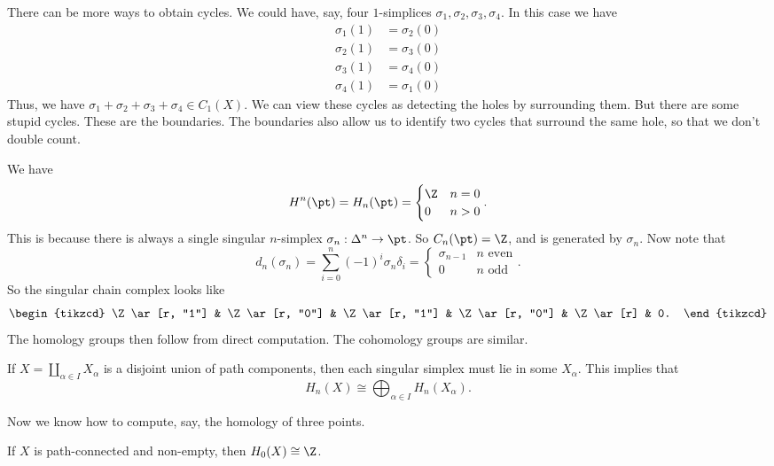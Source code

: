\documentclass[a4paper]{article}
\begin{document}
There can be more ways to obtain cycles. We could have, say, four $1$-simplices $\sigma_1, \sigma_2, \sigma_3, \sigma_4$. In this case we have
\begin{align*}
  \sigma_1(1) &= \sigma_2(0)\\
  \sigma_2(1) &= \sigma_3(0)\\
  \sigma_3(1) &= \sigma_4(0)\\
  \sigma_4(1) &= \sigma_1(0)
\end{align*}
Thus, we have $\sigma_1 + \sigma_2 + \sigma_3 + \sigma_4 \in C_1(X)$. We can view these cycles as detecting the holes by surrounding them. But there are some stupid cycles. %
These are the boundaries. The boundaries also allow us to identify two cycles that surround the same hole, so that we don't double count.

\begin{eg}
  We have
  \[
    H^n(\pt) = H_n(\pt) =
    \begin{cases}
      \Z & n = 0\\
      0 & n > 0
    \end{cases}.
  \]
  This is because there is always a single singular $n$-simplex $\sigma_n: \Delta^n \to \pt$. So $C_n(\pt) = \Z$, and is generated by $\sigma_n$. Now note that
  \[
    d_n(\sigma_n) = \sum_{i = 0}^n (-1)^i \sigma_n \delta_i =
    \begin{cases}
      \sigma_{n - 1} & n\text{ even}\\
      0 & n\text{ odd}
    \end{cases}.
  \]
  So the singular chain complex looks like
  \[
    \begin{tikzcd}
      \Z \ar[r, "1"] & \Z\ar[r, "0"] & \Z \ar[r, "1"] & \Z \ar[r, "0"] & \Z \ar[r] & 0.
    \end{tikzcd}
  \]
  The homology groups then follow from direct computation. The cohomology groups are similar.
\end{eg}

\begin{eg}
  If $X = \coprod_{\alpha \in I} X_\alpha$ is a disjoint union of path components, then each singular simplex must lie in some $X_\alpha$. This implies that
  \[
    H_n(X) \cong \bigoplus_{\alpha \in I} H_n(X_\alpha).
  \]
\end{eg}
Now we know how to compute, say, the homology of three points.

\begin{lemma}
  If $X$ is path-connected and non-empty, then $H_0(X) \cong \Z$.
\end{lemma}
\end{document}
